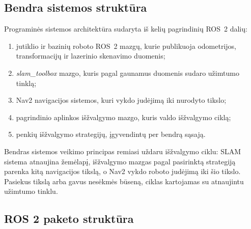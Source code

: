 \documentclass[]{VUMIFTemplateClass}
\begin{document}
\subsection{Bendra sistemos struktūra}

Programinės sistemos architektūra sudaryta iš kelių pagrindinių ROS~2 dalių:
\begin{enumerate}
  \item jutiklio ir bazinių roboto ROS~2 mazgų, kurie publikuoja odometrijos, transformacijų ir lazerinio skenavimo duomenis;
  \item \textit{slam\_toolbox} mazgo, kuris pagal gaunamus duomenis sudaro užimtumo tinklą;
  \item Nav2 navigacijos sistemos, kuri vykdo judėjimą iki nurodyto tikslo;
  \item pagrindinio aplinkos išžvalgymo mazgo, kuris valdo išžvalgymo ciklą;
  \item penkių išžvalgymo strategijų, įgyvendintų per bendrą sąsają.
\end{enumerate}

Bendras sistemos veikimo principas remiasi uždaru išžvalgymo ciklu: SLAM sistema atnaujina žemėlapį, išžvalgymo mazgas pagal pasirinktą strategiją parenka
kitą navigacijos tikslą, o Nav2 vykdo roboto judėjimą iki šio tikslo. Pasiekus tikslą arba gavus nesėkmės būseną, ciklas kartojamas su atnaujintu užimtumo
tinklu.

\subsection{ROS 2 paketo struktūra}
\end{document}
